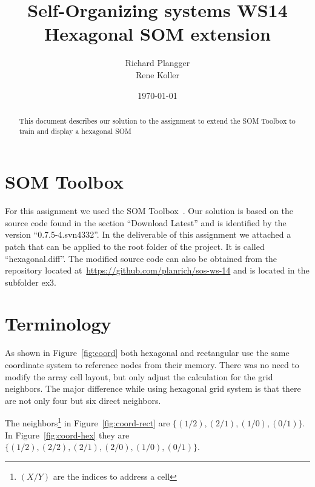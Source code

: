 \documentclass{acm_proc_article-sp}
\begin{document}
\title{Self-Organizing systems WS14\\
       Hexagonal SOM extension}

\author{
Richard Plangger\\
\alignauthor
Rene Koller\\
\alignauthor
}

\date{\today}

\maketitle

\begin{abstract}
    This document describes our solution to the assignment
    to extend the SOM Toolbox to train and display a hexagonal
    SOM
\end{abstract}


\section{SOM Toolbox}

For this assignment we used the SOM Toolbox~\cite{somtoolbox}. Our solution
is based on the source code found in the section ``Download Latest'' and is
identified by the version ``0.7.5-4.svn4332''. In the deliverable of this assignment we attached a patch that can be applied to the root folder of the project. It is called ``hexagonal.diff''. The modified source code can also be obtained from the repository located at~\url{https://github.com/planrich/sos-ws-14} and is located in the subfolder ex3.

\section{Terminology}

As shown in Figure~\ref{fig:coord} both hexagonal and rectangular
use the same coordinate system to reference nodes from their memory.
There was no need to modify the array cell layout, but only adjust the
calculation for the grid neighbors. The major
difference while using hexagonal grid system is that there are not only
four but six direct neighbors.

The neighbors\footnote{$(X/Y)$ are the indices to address a cell} in Figure~\ref{fig:coord-rect}
are $\{(1/2),(2/1),(1/0),(0/1)\}$. In Figure~\ref{fig:coord-hex} they are $\{(1/2),(2/2),(2/1),(2/0),(1/0),(0/1)\}$.
\end{document}

